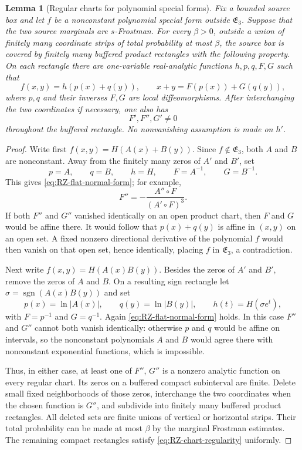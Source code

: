 \documentclass[11pt]{article}
\newtheorem{lemma}[theorem]{Lemma}
\begin{document}
\begin{lemma}[Regular charts for polynomial special forms]
\label{lem:RZ-special-charts}
Fix a bounded source box and let \(f\) be a nonconstant polynomial
special form outside \(\mathfrak E_3\).  Suppose that the two source
marginals are \(s\)-Frostman.  For every \(\beta>0\), outside a union
of finitely many coordinate strips of total probability at most
\(\beta\), the source box is covered by finitely many buffered product
rectangles with the following property.  On each rectangle there are
one-variable real-analytic functions \(h,p,q,F,G\) such that
\begin{equation}
 f(x,y)=h(p(x)+q(y)),\qquad
 x+y=F(p(x))+G(q(y)),
 \label{eq:RZ-flat-normal-form}
\end{equation}
where \(p,q\) and their inverses \(F,G\) are local diffeomorphisms.
After interchanging the two coordinates if necessary, one also has
\begin{equation}
 F',F'',G'\ne0
 \label{eq:RZ-chart-regularity}
\end{equation}
throughout the buffered rectangle.  No nonvanishing assumption is
made on \(h'\).
\end{lemma}

\begin{proof}
Write first \(f(x,y)=H(A(x)+B(y))\).  Since
\(f\notin\mathfrak E_3\), both \(A\) and \(B\) are nonconstant.
Away from the finitely many zeros of \(A'\) and \(B'\), set
\[
 p=A,\qquad q=B,\qquad h=H,
 \qquad F=A^{-1},\qquad G=B^{-1}.
\]
This gives \eqref{eq:RZ-flat-normal-form}; for example,
\[
 F''=-\frac{A''\circ F}{(A'\circ F)^3}.
\]
If both \(F''\) and \(G''\) vanished identically on an open product
chart, then \(F\) and \(G\) would be affine there.  It would follow
that \(p(x)+q(y)\) is affine in \((x,y)\) on an open set.  A fixed
nonzero directional derivative of the polynomial \(f\) would then
vanish on that open set, hence identically, placing \(f\) in
\(\mathfrak E_3\), a contradiction.

Next write \(f(x,y)=H(A(x)B(y))\).  Besides the zeros of \(A'\) and
\(B'\), remove the zeros of \(A\) and \(B\).  On a resulting sign
rectangle let \(\sigma=\operatorname{sgn}(A(x)B(y))\) and set
\[
 p(x)=\ln|A(x)|,\qquad q(y)=\ln|B(y)|,
 \qquad h(t)=H(\sigma e^t),
\]
with \(F=p^{-1}\) and \(G=q^{-1}\).  Again
\eqref{eq:RZ-flat-normal-form} holds.  In this case \(F''\) and
\(G''\) cannot both vanish identically: otherwise \(p\) and \(q\)
would be affine on intervals, so the nonconstant polynomials \(A\)
and \(B\) would agree there with nonconstant exponential functions,
which is impossible.

Thus, in either case, at least one of \(F''\), \(G''\) is a
nonzero analytic function on every regular chart.  Its zeros on a
buffered compact subinterval are finite.  Delete small fixed
neighborhoods of those zeros, interchange the two coordinates when
the chosen function is \(G''\), and subdivide into finitely many
buffered product rectangles.  All deleted sets are finite unions of
vertical or horizontal strips.  Their total probability can be made
at most \(\beta\) by the marginal Frostman estimates.  The remaining
compact rectangles satisfy \eqref{eq:RZ-chart-regularity} uniformly.
\end{proof}
\end{document}
